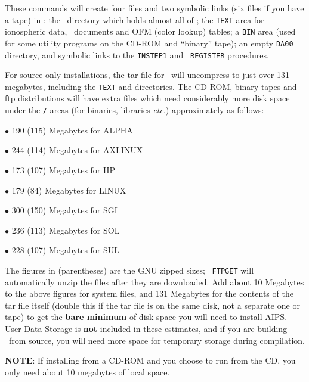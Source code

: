 These commands will create four files and two symbolic links (six files
if you have a tape) in {\tt\AROOT}: the \THISVER\ directory which holds
almost all of \AIPS; the {\tt TEXT} area for ionospheric data,
\AIPS\ documents and OFM (color lookup) tables; a {\tt BIN} area (used
for some utility programs on the CD-ROM and ``binary'' tape); an empty
{\tt DA00} directory, and symbolic links to the {\tt INSTEP1} and {\tt
REGISTER} procedures.


For source-only installations, the tar file for \THISVER\ will
uncompress to just over 131 megabytes, including the {\tt TEXT} and
{\tt\THISVER} directories.
The CD-ROM, binary tapes and ftp distributions will have extra files
which need considerably more disk space under the {\tt\THISVER /\ARCH }
areas (for binaries, libraries {\it etc\/}.) approximately as
follows:\medskip
\item{$\bullet$} 190 (115) Megabytes for ALPHA
\item{$\bullet$} 244 (114) Megabytes for AXLINUX
\item{$\bullet$} 173 (107) Megabytes for HP
\item{$\bullet$} 179 (84) Megabytes for LINUX
\item{$\bullet$} 300 (150) Megabytes for SGI
\item{$\bullet$} 236 (113) Megabytes for SOL
\item{$\bullet$} 228 (107) Megabytes for SUL

\medskip
\noindent The figures in (parentheses) are the GNU zipped sizes; {\tt
FTPGET} will automatically unzip the files after they are downloaded.
Add about 10 Megabytes to the above figures for system files, and 131
Megabytes for the contents of the tar file itself (double this if the
tar file is on the same disk, not a separate one or tape) to get the
{\bf bare minimum} of disk space you will need to install AIPS.  User
Data Storage is {\bf not} included in these estimates, and if you are
building \AIPS\ from source, you will need more space for temporary
storage during compilation.

{\bf NOTE}: If installing from a CD-ROM and you choose to run from the
CD, you only need about 10 megabytes of local space.

